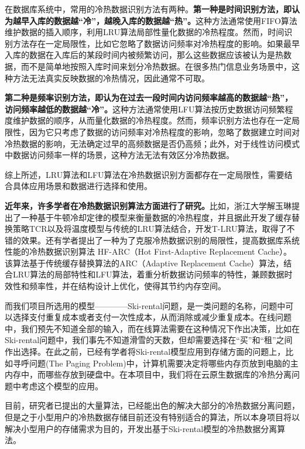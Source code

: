 \documentclass{article}
\begin{document}
在数据库系统中，常用的冷热数据识别方法有两种。\textbf{第一种是时间识别方法，即认为越早入库的数据越“冷”，越晚入库的数据越“热”。}这种方法通常使用FIFO算法维护数据的插入顺序，利用LRU算法局部性量化数据的冷热程度。然而，时间识别方法存在一定局限性，比如它忽略了数据访问频率对冷热程度的影响。如果最早入库的数据在入库后的某段时间内被频繁访问，那么这些数据应该被认为是热数据，而不是简单地按照入库时间来划分冷热数据。在很多热门信息业务场景中，这种方法无法真实反映数据的冷热情况，因此通常不可取。

\textbf{第二种是频率识别方法，即认为在过去一段时间内访问频率越高的数据越“热”，访问频率越低的数据越“冷”。}这种方法通常使用LFU算法按历史数据访问频繁程度维护数据的顺序，从而量化数据的冷热程度。然而，频率识别方法也存在一定局限性，因为它只考虑了数据的访问频率对冷热程度的影响，忽略了数据建立时间对冷热数据的影响，无法确定过早的高频数据是否仍高频；此外，对于线性访问模式中数据访问频率一样的场景，这种方法无法有效区分冷热数据。

综上所述，LRU算法和LFU算法在冷热数据识别方面都存在一定局限性，需要结合具体应用场景和数据进行选择和使用。

\textbf{近年来，许多学者在冷热数据识别算法方面进行了研究。}比如，浙江大学解玉琳提出了一种基于牛顿冷却定律的模型来衡量数据的冷热程度，并且据此开发了缓存替换策略TCR以及将温度模型与传统的LRU算法结合，开发T-LRU算法，取得了不错的效果。\textsuperscript{\cite{1}}还有学者提出了一种为了克服冷热数据识别的局限性，提高数据库系统性能的冷热数据识别算法 HF-ARC（Hot First-Adaptive Replacement Cache）。该算法基于传统缓存替换算法的ARC（Adaptive Replacement Cache）算法，结合LRU算法的局部特性和LFU算法，着重分析数据访问频率的特性，兼顾数据时效性和频率性，并在结构设计上优化，使得其节约内存空间。\textsuperscript{\cite{2}}

而我们项目所选用的模型————Ski-rental问题，是一类问题的名称，问题中可以选择支付重复成本或者支付一次性成本，从而消除或减少重复成本。在线问题中，我们预先不知道全部的输入，而在线算法需要在这种情况下作出决策，比如在Ski-rental问题中，我们事先不知道滑雪的天数，但却需要选择在“买”和“租”之间作出选择。在此之前，已经有学者将Ski-rental模型应用到存储方面的问题上，比如寻呼问题(The Paging Problem)中，计算机需要决定将哪些内存页放到电脑的主内存中，而哪些存放到硬盘中。\textsuperscript{\cite{3}}在本项目中，我们将在云原生数据库的冷热分离问题中考虑这个模型的应用。

目前，研究者已提出的大量算法，已经能出色的解决大部分的冷热数据分离问题，但是之于小型用户的冷热数据存储目前还没有特别适合的算法，所以本身项目将以解决小型用户的存储需求为目的，开发出基于Ski-rental模型的冷热数据分离算法。
\end{document}
